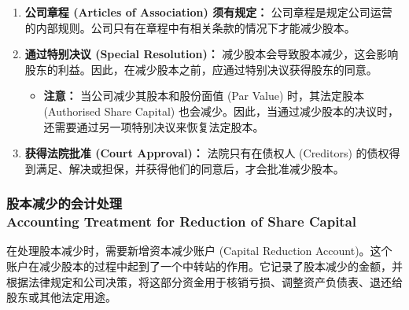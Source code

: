 \documentclass{article}
\begin{document}
\begin{enumerate}
    \item \textbf{公司章程 (Articles of Association) 须有规定：} 公司章程是规定公司运营的内部规则。公司只有在章程中有相关条款的情况下才能减少股本。
    \item \textbf{通过特别决议 (Special Resolution)：} 减少股本会导致股本减少，这会影响股东的利益。因此，在减少股本之前，应通过特别决议获得股东的同意。
        \begin{itemize}
            \item \textbf{注意：} 当公司减少其股本和股份面值 (Par Value) 时，其法定股本 (Authorised Share Capital) 也会减少。因此，当通过减少股本的决议时，还需要通过另一项特别决议来恢复法定股本。
        \end{itemize}
    \item \textbf{获得法院批准 (Court Approval)：} 法院只有在债权人 (Creditors) 的债权得到满足、解决或担保，并获得他们的同意后，才会批准减少股本。
\end{enumerate}

\subsubsection{股本减少的会计处理\\Accounting Treatment for Reduction of Share Capital}

在处理股本减少时，需要新增资本减少账户 (Capital Reduction Account)。这个账户在减少股本的过程中起到了一个中转站的作用。它记录了股本减少的金额，并根据法律规定和公司决策，将这部分资金用于核销亏损、调整资产负债表、退还给股东或其他法定用途。
\end{document}

